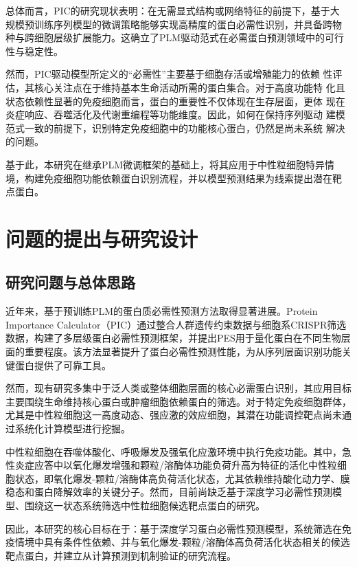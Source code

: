 总体而言，PIC的研究现状表明：在无需显式结构或网络特征的前提下，基于大
规模预训练序列模型的微调策略能够实现高精度的蛋白必需性识别，并具备跨物
种与跨细胞层级扩展能力。这确立了PLM驱动范式在必需蛋白预测领域中的可行
性与稳定性。

然而，PIC驱动模型所定义的“必需性”主要基于细胞存活或增殖能力的依赖
性评估，其核心关注点在于维持基本生命活动所需的蛋白集合。对于高度功能特
化且状态依赖性显著的免疫细胞而言，蛋白的重要性不仅体现在生存层面，更体
现在炎症响应、吞噬活化及代谢重编程等功能维度。因此，如何在保持序列驱动
建模范式一致的前提下，识别特定免疫细胞中的功能核心蛋白，仍然是尚未系统
解决的问题。

基于此，本研究在继承PLM微调框架的基础上，将其应用于中性粒细胞特异情
境，构建免疫细胞功能依赖蛋白识别流程，并以模型预测结果为线索提出潜在靶
点蛋白。

\section{问题的提出与研究设计}

\subsection{研究问题与总体思路}

近年来，基于预训练PLM的蛋白质必需性预测方法取得显著进展。Protein Importance Calculator（PIC）通过整合人群遗传约束数据与细胞系CRISPR筛选数据，构建了多层级蛋白必需性预测框架，并提出PES用于量化蛋白在不同生物层面的重要程度\cite{kang2024comprehensive}。该方法显著提升了蛋白必需性预测性能，为从序列层面识别功能关键蛋白提供了可靠工具。

然而，现有研究多集中于泛人类或整体细胞层面的核心必需蛋白识别，其应用目标主要围绕生命维持核心蛋白或肿瘤细胞依赖蛋白的筛选。对于特定免疫细胞群体，尤其是中性粒细胞这一高度动态、强应激的效应细胞，其潜在功能调控靶点尚未通过系统化计算模型进行挖掘。

中性粒细胞在吞噬体酸化、呼吸爆发及强氧化应激环境中执行免疫功能\cite{arocacrevilln2024neutrophils}。其中，急性炎症应答中以氧化爆发增强和颗粒/溶酶体功能负荷升高为特征的活化中性粒细胞状态，即氧化爆发-颗粒/溶酶体高负荷活化状态，尤其依赖维持酸化动力学、膜稳态和蛋白降解效率的关键分子。然而，目前尚缺乏基于深度学习必需性预测模型、围绕这一状态系统筛选中性粒细胞候选靶点蛋白的研究。

因此，本研究的核心目标在于：基于深度学习蛋白必需性预测模型，系统筛选在免疫情境中具有条件性依赖、并与氧化爆发-颗粒/溶酶体高负荷活化状态相关的候选靶点蛋白，并建立从计算预测到机制验证的研究流程。

